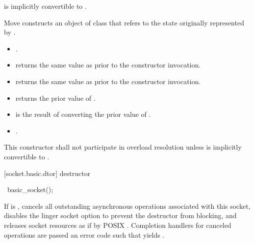 \begin{itemdescr}
\pnum
\requires {} is implicitly convertible to .

\pnum
\effects Move constructs an object of class  that refers to the state originally represented by .

\pnum
\postconditions
\begin{itemize}
\item
{}.
\item
{} returns the same value as  prior to the constructor invocation.
\item
{} returns the same value as  prior to the constructor invocation.
\item
{} returns the prior value of .
\item
{} is the result of converting the prior value of .
\item
{}.
\end{itemize}

\pnum
\remarks This constructor shall not participate in overload resolution unless  is implicitly convertible to .
\end{itemdescr}



[socket.basic.dtor]{ destructor}

\begin{itemdecl}
~basic_socket();
\end{itemdecl}

\begin{itemdescr}
\pnum
\effects If  is , cancels all outstanding asynchronous operations associated with this socket, disables the linger socket option to prevent the destructor from blocking, and releases socket resources as if by POSIX . Completion handlers for canceled operations are passed an error code  such that  yields .
\end{itemdescr}



